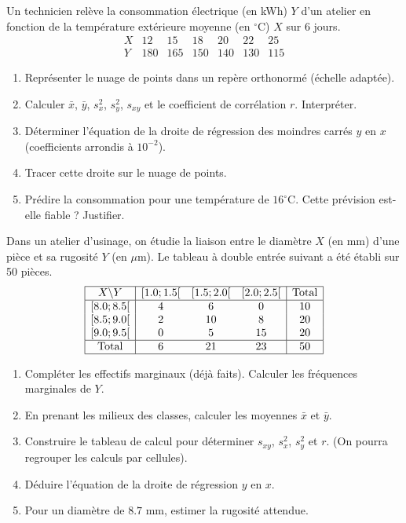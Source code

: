 \documentclass[11pt]{article}
\newcounter{popsec}
\newcounter{popsub}
\newcommand{\courssub}[1]{%
  \stepcounter{popsub}%
  \par\vspace{9pt}\noindent{\popxbold\fontsize{11.5}{13}\selectfont\color{popink}{\color{poporange}\thepopsec.\thepopsub}\hspace{6pt}#1}\par\nopagebreak\vspace{4pt}
}
\begin{document}
\courssub{Je m'entraîne}

\begin{exercice}
Un technicien relève la consommation électrique (en kWh) $Y$ d'un atelier en fonction de la température extérieure moyenne (en $^\circ$C) $X$ sur 6 jours.
\[
\begin{array}{c|cccccc}
X & 12 & 15 & 18 & 20 & 22 & 25 \\ \hline
Y & 180 & 165 & 150 & 140 & 130 & 115
\end{array}
\]
\begin{enumerate}
\item Représenter le nuage de points dans un repère orthonormé (échelle adaptée).
\item Calculer $\bar{x}$, $\bar{y}$, $s_x^2$, $s_y^2$, $s_{xy}$ et le coefficient de corrélation $r$. Interpréter.
\item Déterminer l'équation de la droite de régression des moindres carrés $y$ en $x$ (coefficients arrondis à $10^{-2}$).
\item Tracer cette droite sur le nuage de points.
\item Prédire la consommation pour une température de $16^\circ$C. Cette prévision est-elle fiable ? Justifier.
\end{enumerate}
\end{exercice}

\begin{exercice}
Dans un atelier d'usinage, on étudie la liaison entre le diamètre $X$ (en mm) d'une pièce et sa rugosité $Y$ (en $\mu$m). Le tableau à double entrée suivant a été établi sur 50 pièces.
\[
\begin{array}{|c|ccc|c|}\hline
X \backslash Y & [1.0; 1.5[ & [1.5; 2.0[ & [2.0; 2.5[ & \text{Total} \\ \hline
\relax [8.0; 8.5[ & 4 & 6 & 0 & 10 \\
\relax [8.5; 9.0[ & 2 & 10 & 8 & 20 \\
\relax [9.0; 9.5[ & 0 & 5 & 15 & 20 \\ \hline
\text{Total} & 6 & 21 & 23 & 50 \\ \hline
\end{array}
\]
\begin{enumerate}
\item Compléter les effectifs marginaux (déjà faits). Calculer les fréquences marginales de $Y$.
\item En prenant les milieux des classes, calculer les moyennes $\bar{x}$ et $\bar{y}$.
\item Construire le tableau de calcul pour déterminer $s_{xy}$, $s_x^2$, $s_y^2$ et $r$. (On pourra regrouper les calculs par cellules).
\item Déduire l'équation de la droite de régression $y$ en $x$.
\item Pour un diamètre de $8.7$ mm, estimer la rugosité attendue.
\end{enumerate}
\end{exercice}
\end{document}
